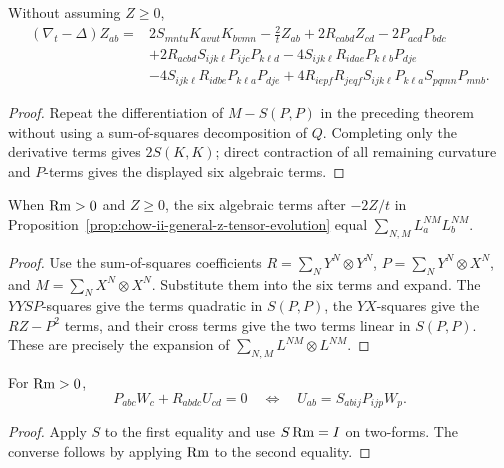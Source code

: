 \begin{proposition}
\label{prop:chow-ii-general-z-tensor-evolution}
Without assuming \(Z\ge0\),
\[
\begin{aligned}
(\nabla_t-\Delta)Z_{ab}={}&2S_{mntu}K_{avut}K_{bvmn}-\frac2tZ_{ab}
+2R_{cabd}Z_{cd}-2P_{acd}P_{bdc}\\
&+2R_{acbd}S_{ijk\ell}P_{ijc}P_{k\ell d}
-4S_{ijk\ell}R_{idae}P_{k\ell b}P_{dje}\\
&-4S_{ijk\ell}R_{idbe}P_{k\ell a}P_{dje}
+4R_{iepf}R_{jeqf}S_{ijk\ell}P_{k\ell a}S_{pqmn}P_{mnb}.
\end{aligned}
\]
\end{proposition}
\begin{proof}
Repeat the differentiation of \(M-S(P,P)\) in the preceding theorem without
using a sum-of-squares decomposition of \(Q\).  Completing only the derivative
terms gives \(2S(K,K)\); direct contraction of all remaining curvature and
\(P\)-terms gives the displayed six algebraic terms.
\end{proof}

\begin{lemma}
\label{lem:chow-ii-z-reaction-sum-of-squares}
When \(\operatorname{Rm}>0\) and \(Z\ge0\), the six algebraic terms after \(-2Z/t\) in
Proposition~\ref{prop:chow-ii-general-z-tensor-evolution} equal
\(\sum_{N,M}L_a^{NM}L_b^{NM}\).
\end{lemma}
\begin{proof}
Use the sum-of-squares coefficients
\(R=\sum_NY^N\otimes Y^N\),
\(P=\sum_NY^N\otimes X^N\), and
\(M=\sum_NX^N\otimes X^N\).  Substitute them into the six terms and expand.
The \(YYSP\)-squares give the terms quadratic in \(S(P,P)\), the \(YX\)-squares
give the \(RZ-P^2\) terms, and their cross terms give the two terms linear in
\(S(P,P)\).  These are precisely the expansion of
\(\sum_{N,M}L^{NM}\otimes L^{NM}\).
\end{proof}

\begin{lemma}
\label{lem:chow-ii-characterization-minimizing-two-form}
For \(\operatorname{Rm}>0\),
\[
P_{abc}W_c+R_{abdc}U_{cd}=0
\quad\Longleftrightarrow\quad
U_{ab}=S_{abij}P_{ijp}W_p.
\]
\end{lemma}
\begin{proof}
Apply \(S\) to the first equality and use \(S\operatorname{Rm}=I\) on two-forms.  The
converse follows by applying \(\operatorname{Rm}\) to the second equality.
\end{proof}

